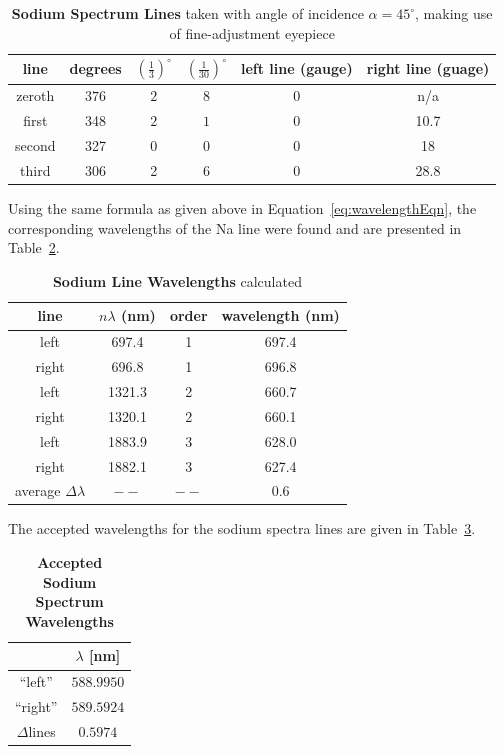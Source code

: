 \documentclass[paper=a4, fontsize=11pt]{scrartcl} %
\numberwithin{equation}{section}
\numberwithin{figure}{section}
\numberwithin{table}{section}
\begin{document}
\begin{table}[H]
\centering
\caption{\textbf{Sodium Spectrum Lines} taken with angle of incidence $\alpha = 45^\circ$, making use of fine-adjustment eyepiece }
\begin{tabular}{ || c | c c c c c || }
  \hline
  \hline
  line & degrees & $(\frac{1}{3})^\circ$ & $(\frac{1}{30})^\circ$ & left line (gauge)  & right line (guage) \\
  \hline
  zeroth & $376$ & $2$ & $8$ & $0$ & n/a \\
  first & 348 & $2$ & $1$ & 0 & 10.7 \\
  second & 327 & 0 & 0 & 0 & 18 \\
  third & 306 & 2 & 6 & 0 & 28.8 \\
  \hline
  \hline
\end{tabular}
\label{table:sodium45}
\end{table}

Using the same formula as given above in Equation~\ref{eq:wavelengthEqn}, the corresponding wavelengths of the Na line were found and are presented in Table~\ref{table:na-wavelength}.

\begin{table}[H]
\centering
\caption{\textbf{Sodium Line Wavelengths} calculated }
\begin{tabular}{ || c | c c c || }
  \hline
  \hline
  line & $n\lambda$ (nm) & order & wavelength (nm)  \\
  \hline
  left & 697.4 & 1 & 697.4 \\
  right & 696.8 & 1 & 696.8 \\
  left & 1321.3 & 2 & 660.7 \\
  right & 1320.1 & 2 & 660.1 \\
  left & 1883.9 & 3 & 628.0 \\
  right & 1882.1 & 3 & 627.4 \\
  \hline
  average $\Delta\lambda$ & $--$ & $--$ & 0.6 \\
  \hline
  \hline
\end{tabular}
\label{table:na-wavelength}
\end{table}

The accepted wavelengths for the sodium spectra lines are given in Table~\ref{table:na-accepted}.

\begin{table}[H]
\centering
\caption{\textbf{Accepted Sodium Spectrum Wavelengths}}
\begin{tabular}{ || c | c || }
  \hline
  \hline
   & $\lambda$ [nm] \\
  \hline
  ``left'' & $588.9950$ \\
  ``right'' & $589.5924$ \\
  \hline
  $\Delta$lines & $0.5974$ \\
  \hline
  \hline
\end{tabular}
\label{table:na-accepted}
\end{table}
\end{document}
